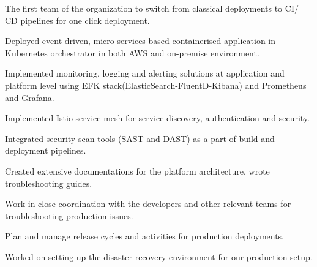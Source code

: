 \begin{cventries}
{\begin{cvitems}
        \item {The first team of the organization to switch from classical deployments to CI/ CD pipelines for one click deployment.}
        \item {Deployed event-driven, micro-services based containerised application in Kubernetes orchestrator in both AWS and on-premise environment.}
        \item {Implemented monitoring, logging and alerting solutions at application and platform level using EFK stack(ElasticSearch-FluentD-Kibana) and Prometheus and Grafana.}
        \item {Implemented Istio service mesh for service discovery, authentication and security.}
        \item {Integrated security scan tools (SAST and DAST) as a part of build and deployment pipelines.}
        \item {Created extensive documentations for the platform architecture, wrote troubleshooting guides.}
        \item {Work in close coordination with the developers and other relevant teams for troubleshooting production issues.}
        \item {Plan and manage release cycles and activities for production deployments.}
        \item {Worked on setting up the disaster recovery environment for our production setup.}
          \end{cvitems}
    }
\end{cventries}
